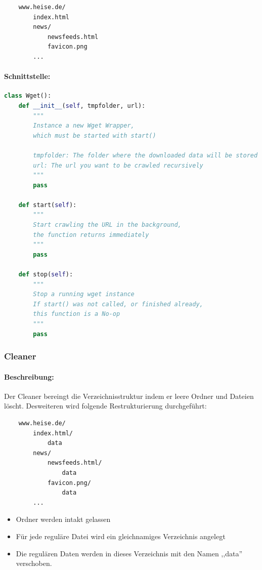 \begin{verbatim}
    www.heise.de/
        index.html
        news/
            newsfeeds.html
            favicon.png
        ...
\end{verbatim}

\paragraph{Schnittstelle:}
\label{par:schnittstelle_}
\hfill
\begin{lstlisting}[language=python]
class Wget():
    def __init__(self, tmpfolder, url):
        """
        Instance a new Wget Wrapper,
        which must be started with start()

        tmpfolder: The folder where the downloaded data will be stored
        url: The url you want to be crawled recursively
        """
        pass

    def start(self): 
        """
        Start crawling the URL in the background,
        the function returns immediately
        """
        pass

    def stop(self):
        """
        Stop a running wget instance
        If start() was not called, or finished already,
        this function is a No-op
        """
        pass
\end{lstlisting}


\newpage
\subsubsection{Cleaner}
\label{ssub:cleaner}
\paragraph{Beschreibung:}
\label{par:beschreibung_}
Der Cleaner bereingt die Verzeichnisstruktur indem er leere Ordner und Dateien löscht.
Desweiteren wird folgende Restrukturierung durchgeführt:
\begin{verbatim}
    www.heise.de/ 
        index.html/
            data
        news/
            newsfeeds.html/
                data
            favicon.png/
                data
        ...
\end{verbatim}


\begin{itemize}
    \item Ordner werden intakt gelassen
    \item Für jede reguläre Datei wird ein gleichnamiges Verzeichnis angelegt
    \item Die regulären Daten werden in dieses Verzeichnis mit den Namen ,,data'' verschoben.
\end{itemize}

